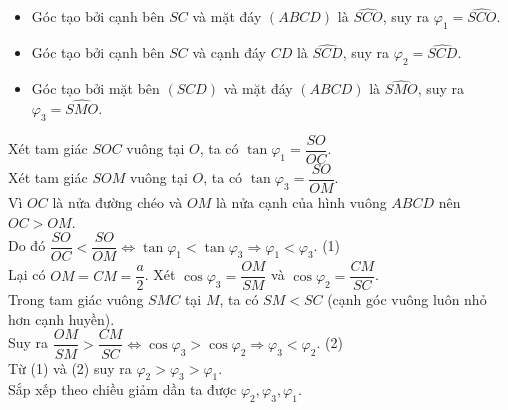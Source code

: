 \begin{ex}
{{
		}
		\begin{itemize}
			\item Góc tạo bởi cạnh bên $SC$ và mặt đáy $(ABCD)$ là $\widehat{SCO}$, suy ra $\varphi_1 = \widehat{SCO}$.
			\item Góc tạo bởi cạnh bên $SC$ và cạnh đáy $CD$ là $\widehat{SCD}$, suy ra $\varphi_2 = \widehat{SCD}$.
			\item Góc tạo bởi mặt bên $(SCD)$ và mặt đáy $(ABCD)$ là $\widehat{SMO}$, suy ra $\varphi_3 = \widehat{SMO}$.
		\end{itemize}
		Xét tam giác $SOC$ vuông tại $O$, ta có $\tan \varphi_1 = \dfrac{SO}{OC}$.\\
		Xét tam giác $SOM$ vuông tại $O$, ta có $\tan \varphi_3 = \dfrac{SO}{OM}$.\\
		Vì $OC$ là nửa đường chéo và $OM$ là nửa cạnh của hình vuông $ABCD$ nên $OC > OM$.\\
		Do đó $\dfrac{SO}{OC} < \dfrac{SO}{OM} \Leftrightarrow \tan \varphi_1 < \tan \varphi_3 \Rightarrow \varphi_1 < \varphi_3$. \hfill (1)\\
		\noindent Lại có $OM = CM = \dfrac{a}{2}$. Xét $\cos \varphi_3 = \dfrac{OM}{SM}$ và $\cos \varphi_2 = \dfrac{CM}{SC}$.\\
		Trong tam giác vuông $SMC$ tại $M$, ta có $SM < SC$ (cạnh góc vuông luôn nhỏ hơn cạnh huyền).\\
		Suy ra $\dfrac{OM}{SM} > \dfrac{CM}{SC} \Leftrightarrow \cos \varphi_3 > \cos \varphi_2 \Rightarrow \varphi_3 < \varphi_2$. \hfill (2)\\
		Từ (1) và (2) suy ra $\varphi_2 > \varphi_3 > \varphi_1$.\\
		Sắp xếp theo chiều giảm dần ta được $\varphi_2, \varphi_3, \varphi_1$.
	}
\end{ex}

